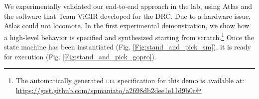 
We experimentally validated our end-to-end approach in the lab, using Atlas and the software that Team ViGIR developed for the DRC.
Due to a hardware issue, Atlas could not locomote.
In the first experimental demonstration, we show how a high-level behavior is specified and synthesized starting from scratch.\footnote{The automatically generated \textsc{ltl} specification for this demo is available at: \scriptsize{\url{https://gist.github.com/spmaniato/a2698db2dee1e11d9b0c}}}
Once the state machine has been instantiated (Fig. \ref{Fig:stand_and_pick_sm}), it is ready for execution (Fig. \ref{Fig:stand_and_pick_gopro}).

